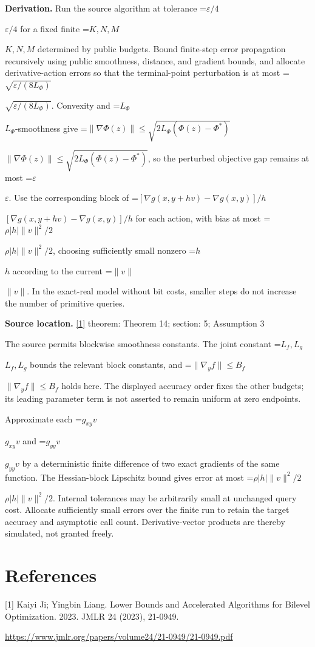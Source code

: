 \documentclass[10pt,a4paper]{article}
\newcommand{\AtlasMath}[1]{\par\begingroup\centering\setbox0=\hbox{$\displaystyle #1$}\ifdim\wd0>1.4\linewidth\typeout{ATLAS WIDE FORMULA: \the\wd0}\fi\ifdim\wd0>\linewidth\resizebox{\linewidth}{!}{\box0}\else\box0\fi\par\endgroup}
\newcommand{\AtlasInlineMath}[1]{\begingroup\setbox0=\hbox{$#1$}\ifdim\wd0>.4\linewidth\endgroup\AtlasMath{#1}\else\endgroup$#1$\fi}
\begin{document}
\textbf{Derivation.} Run the source algorithm at tolerance \AtlasInlineMath{\varepsilon/4} for a fixed finite \AtlasInlineMath{K,N,M} determined by public budgets. Bound finite-step error propagation recursively using public smoothness, distance, and gradient bounds, and allocate derivative-action errors so that the terminal-point perturbation is at most \AtlasInlineMath{\sqrt{\varepsilon/(8L_\Phi)}}. Convexity and \AtlasInlineMath{L_\Phi}-smoothness give \AtlasInlineMath{\|\nabla\Phi(z)\|\le\sqrt{2L_\Phi(\Phi(z)-\Phi^*)}}, so the perturbed objective gap remains at most \AtlasInlineMath{\varepsilon}. Use the corresponding block of \AtlasInlineMath{[\nabla g(x,y+hv)-\nabla g(x,y)]/h} for each action, with bias at most \AtlasInlineMath{\rho|h|\|v\|^2/2}, choosing sufficiently small nonzero \AtlasInlineMath{h} according to the current \AtlasInlineMath{\|v\|}. In the exact-real model without bit costs, smaller steps do not increase the number of primitive queries.

\textbf{Source location.} \href{https://www.jmlr.org/papers/volume24/21-0949/21-0949.pdf}{[1]} theorem: Theorem 14; section: 5; Assumption 3

The source permits blockwise smoothness constants. The joint constant \AtlasInlineMath{L_f,L_g} bounds the relevant block constants, and \AtlasInlineMath{\|\nabla_yf\|\le B_f} holds here. The displayed accuracy order fixes the other budgets; its leading parameter term is not asserted to remain uniform at zero endpoints.

Approximate each \AtlasInlineMath{g_{xy}v} and \AtlasInlineMath{g_{yy}v} by a deterministic finite difference of two exact gradients of the same function. The Hessian-block Lipschitz bound gives error at most \AtlasInlineMath{\rho |h|\|v\|^2/2}. Internal tolerances may be arbitrarily small at unchanged query cost. Allocate sufficiently small errors over the finite run to retain the target accuracy and asymptotic call count. Derivative-vector products are thereby simulated, not granted freely.

\section{References}
[1] Kaiyi Ji; Yingbin Liang. Lower Bounds and Accelerated Algorithms for Bilevel Optimization. 2023. JMLR 24 (2023), 21-0949.

\url{https://www.jmlr.org/papers/volume24/21-0949/21-0949.pdf}
\end{document}

